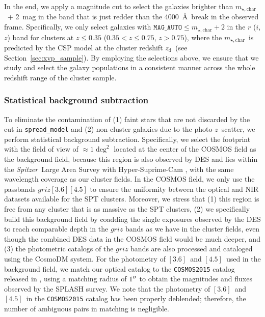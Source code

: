 \documentclass[useAMS,usenatbib,iop,numberedappendix]{mn2e}
\newcommand{\redshift}{\ensuremath{z}}
\newcommand{\angstrom}{\textup{\AA}}
\newcommand{\Spitzer}{\emph{Spitzer}}
\newcommand{\zd}{\ensuremath{z_{\mathrm{d}}}}
\newcommand{\mstarchar}{\ensuremath{m_{\star, \mathrm{char}}}}
\newcommand{\IRACone}{\ensuremath{[3.6]}}
\newcommand{\IRACtwo}{\ensuremath{[4.5]}}
\begin{document}
In the end, we apply a magnitude cut to select the galaxies brighter than \mstarchar\ + 2~mag in the band that is just redder than the 4000~\angstrom\ break in the observed frame.
Specifically, we only select galaxies with $\mathtt{MAG\_AUTO} \le \mstarchar + 2$ in the $r$ ($i$, $z$) band for clusters at $\redshift \le 0.35$ ($0.35 < \redshift \le 0.75$, $\redshift > 0.75$), where the \mstarchar\ is predicted by the CSP model at the cluster redshift \zd\ (see Section~\ref{sec:xvp_sample}).  By employing the selections above, we ensure that we study and select the galaxy populations in a consistent manner across the whole redshift range of the cluster sample.


\subsubsection{Statistical background subtraction}
\label{sec:statistical_background_subtraction}

To eliminate the contamination of (1) faint stars that are not discarded by the cut in \texttt{spread\_model} and (2) non-cluster galaxies 
due to
the photo-\redshift\ scatter, we perform statistical background subtraction.  Specifically, we select the footprint with the field of view of $\approx1\deg^{2}$ located at the center of the COSMOS field \citep{capak2007, ilbert2008} as the background field, because this region is also observed by DES and lies within the \Spitzer\ Large Area Survey with Hyper-Suprime-Cam \citep[SPLASH, ][]{capak12}, with the same wavelength coverage as our cluster fields.
In the COSMOS field, we only use the passbands $griz\IRACone\IRACtwo$ to ensure the uniformity between the optical and NIR datasets available for the SPT clusters.
Moreover, we stress that (1) this region is free from any cluster that is as massive as the SPT clusters, (2) we specifically build this background field by coadding the single exposures observed by the DES to reach comparable depth in the $griz$ bands as we have in the cluster fields, even though the combined DES data in the COSMOS field would be much deeper, and (3) the photometric catalogs of the $griz$ bands are also processed and cataloged using the CosmoDM system.  
For the photometry of \IRACone\ and \IRACtwo\ used in the background field, we match our optical catalog to the \texttt{COSMOS2015} catalog released in \cite{laigle16}, using a matching radius of $1\hbox{$^{\prime\prime}$}$ to obtain the magnitudes and fluxes observed by the SPLASH survey.
We note that the photometry of \IRACone\ and \IRACtwo\ in the \texttt{COSMOS2015} catalog has been properly deblended; therefore, the number of ambiguous pairs in matching is negligible.  
\end{document}

